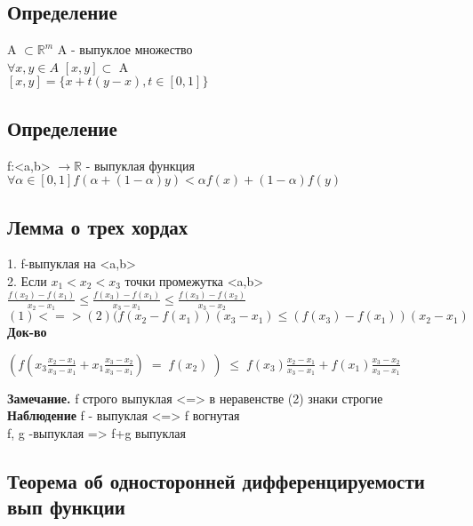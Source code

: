 \documentclass[12pt, a4paper]{article}
\begin{document}
\subsection{Определение}
    A $\subset \mathbb{R}^m$ A - выпуклое множество \\
    $\forall x, y \in A$  $[x,y] \subset$ A \\
    $[x,y]=\lbrace x+t(y-x), t \in [0,1] \rbrace$ \\

\subsection{Определение}
    f:<a,b> $\rightarrow \mathbb{R}$ - выпуклая функция \\
    $\forall \alpha \in [0,1] f (\alpha + (1-\alpha)y)< \alpha f(x) + (1-\alpha)f(y)$ \\

\subsection{Лемма о трех хордах}
   1. f-выпуклая на <a,b> \\
   2. Если $x_{1} < x_{2} < x_{3}$  точки промежутка <a,b> \\
   $ \frac{f(x_2)-f(x_1)}{x_2-x_1}\leq\frac{\displaystyle f(x_3)-f(x_1)}{\displaystyle x_3-x_1}\leq\frac{\displaystyle f(x_3)-f(x_2)}{\displaystyle x_3-x_2}$ \\
    $(1) <=> (2) (f(x_2-f(x_1))(x_3 -x_1) \leq (f(x_3)-f(x_{1}))(x_{2}-x_{1})$ \\

\textbf{Док-во}

    $(f(x_3\frac{x_2-x_1}{x_3-x_1}+x_1\frac{x_3-x_2}{x_3-x_1})\;=\;f(x_2)\;)\;\leq\;f(x_3)\frac{x_2-x_1}{x_3-x_1}+f(x_1)\frac{x_3-x_2}{x_3-x_1}$

 \textbf{Замечание.} 
    f строго выпуклая <=> в неравенстве (2) знаки строгие \\
 \textbf{Наблюдение} f - выпуклая <=> f вогнутая \\
    f, g -выпуклая => f+g выпуклая 
 
 \subsection{Теорема об односторонней дифференцируемости вып функции}
 
\end{document}
